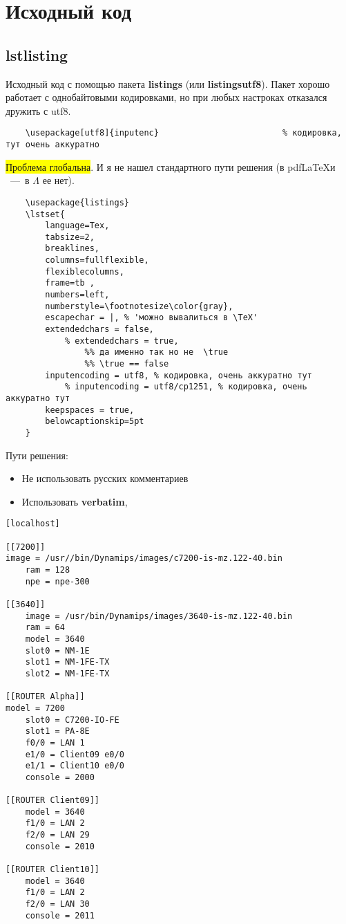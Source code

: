 \section[Исходный код]{Исходный код}

\subsection{lstlisting}
Исходный код с помощью пакета \textbf{listings} (или \textbf{listingsutf8}).
Пакет хорошо работает с однобайтовыми кодировками, но при любых настроках отказался дружить с utf8.

\begin{lstlisting}
	\usepackage[utf8]{inputenc}							% кодировка, тут очень аккуратно
\end{lstlisting}

\colorbox{yellow}{Проблема глобальна}.
И я не нашел стандартного пути решения (в pdf\LaTeX и \XeTeX~---~в $\Lambda$ ее нет).

\begin{lstlisting}[escapeinside='', firstnumber=100]
	%\usepackage{listingsutf8}	
	\usepackage{listings}
	\lstset{
		language=Tex,
		tabsize=2,
		breaklines,
		columns=fullflexible,
		flexiblecolumns,
		frame=tb ,
		numbers=left,
		numberstyle=\footnotesize\color{gray},
		escapechar = |, % 'можно вывалиться в \TeX' 
		extendedchars = false,
			% extendedchars = true, 
				%% да именно так но не  \true
				%% \true == false
		inputencoding = utf8, % кодировка, очень аккуратно тут
			% inputencoding = utf8/cp1251, % кодировка, очень аккуратно тут
		keepspaces = true,
		belowcaptionskip=5pt
	}
\end{lstlisting}

Пути решения:
\begin{itemize}
	\item Не использовать русских комментариев
	\item Использовать \textbf{verbatim}, 
\end{itemize}

\begin{lstlisting}[language=ConfigNetTopo]
[localhost]

[[7200]]
image = /usr//bin/Dynamips/images/c7200-is-mz.122-40.bin
	ram = 128
	npe = npe-300

[[3640]]
	image = /usr/bin/Dynamips/images/3640-is-mz.122-40.bin
	ram = 64
	model = 3640
	slot0 = NM-1E
	slot1 = NM-1FE-TX
	slot2 = NM-1FE-TX
		
[[ROUTER Alpha]]
model = 7200
	slot0 = C7200-IO-FE
	slot1 = PA-8E
	f0/0 = LAN 1
	e1/0 = Client09 e0/0
	e1/1 = Client10 e0/0	
	console = 2000

[[ROUTER Client09]]
	model = 3640
	f1/0 = LAN 2
	f2/0 = LAN 29		
	console = 2010		
		
[[ROUTER Client10]]
	model = 3640
	f1/0 = LAN 2
	f2/0 = LAN 30	
	console = 2011
\end{lstlisting}


